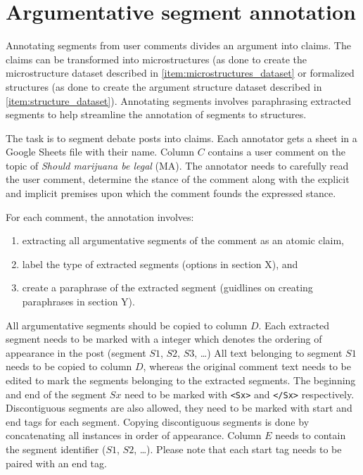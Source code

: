 \section{Argumentative segment annotation}
\label{sec:argseg_annotation}

Annotating segments from user comments divides an
argument into claims. The claims can be transformed into microstructures
(as done to create the microstructure dataset described in \ref{item:microstructures_dataset} or 
formalized structures (as done to create the argument structure 
dataset described in \ref{item:structure_dataset}). Annotating segments 
involves paraphrasing extracted
segments to help streamline the annotation of segments to structures. 

The task is to segment debate posts into claims. Each 
annotator gets a sheet in a Google Sheets file with their name. 
Column $C$ contains a user comment on the topic of \textit{Should marijuana be legal} (MA).
The annotator needs to carefully read the user comment, determine the stance of the 
comment along with the explicit and implicit premises upon which the comment 
founds the expressed stance. 

For each comment, the annotation involves:
\begin{enumerate}
\item extracting all argumentative segments of the comment as an atomic claim,
\item label the type of extracted segments (options in section X), and
\item create a paraphrase of the extracted segment (guidlines on creating paraphrases in section Y).
\end{enumerate}
All argumentative segments should be copied to column $D$. 
Each extracted segment needs to be marked with a integer which denotes the
ordering of appearance in the post (segment $S1$, $S2$, $S3$, \dots)
All text belonging to segment $S1$ needs to be copied to column $D$, whereas
the original comment text needs to be edited to mark the segments belonging to 
the extracted segments. The beginning and end 
of the segment $Sx$ need to be marked with \texttt{<Sx>} and \texttt{</Sx>} respectively. 
Discontiguous segments are also allowed, they need to be marked with start and end tags
for each segment. Copying discontiguous segments is done by concatenating all 
instances in order of appearance. 
Column $E$ needs to contain the segment 
identifier ($S1$, $S2$, \dots). Please note that each start tag needs to be
paired with an end tag. 

